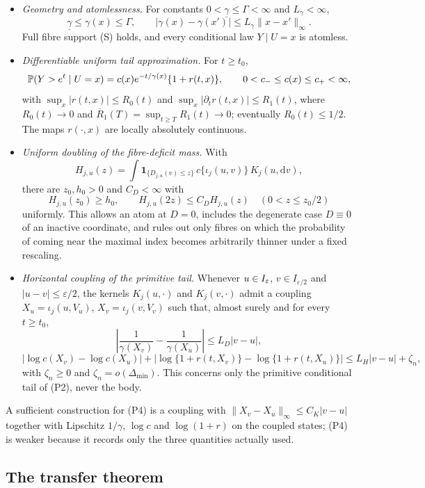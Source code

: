 \begin{itemize}
\item[(P1)] \emph{Geometry and atomlessness.} For constants
 $0<\underline\gamma\le\Gamma<\infty$ and $L_\gamma<\infty$,
 \[
  \underline\gamma\le\gamma(x)\le\Gamma,
  \qquad
  |\gamma(x)-\gamma(x')|\le L_\gamma\|x-x'\|_\infty .
 \]
 Full fibre support (S) holds, and every conditional law $Y\mid U=x$ is
 atomless.
\item[(P2)] \emph{Differentiable uniform tail approximation.} For
 $t\ge t_0$,
 \[
  \mathbb P(Y>e^t\mid U=x)=c(x)e^{-t/\gamma(x)}\{1+r(t,x)\},
  \qquad 0<c_-\le c(x)\le c_+<\infty,
 \]
 with $\sup_x|r(t,x)|\le R_0(t)$ and
 $\sup_x|\partial_tr(t,x)|\le R_1(t)$, where $R_0(t)\to0$ and
 $\overline R_1(T)=\sup_{t\ge T}R_1(t)\to0$; eventually
 $R_0(t)\le1/2$. The maps $r(\cdot,x)$ are locally absolutely
 continuous.
\item[(P3)] \emph{Uniform doubling of the fibre-deficit mass.} With
 \[
  H_{j,u}(z)=\int\mathbf 1_{\{D_{j,u}(v)\le z\}}\,
  c\{\iota_j(u,v)\}\,K_j(u,\mathrm dv),
 \]
 there are $z_0,h_0>0$ and $C_D<\infty$ with
 \[
  H_{j,u}(z_0)\ge h_0,
  \qquad
  H_{j,u}(2z)\le C_DH_{j,u}(z)
  \quad(0<z\le z_0/2)
 \]
 uniformly. This allows an atom at $D=0$, includes the degenerate case
 $D\equiv0$ of an inactive coordinate, and rules out only fibres on
 which the probability of coming near the maximal index becomes
 arbitrarily thinner under a fixed rescaling.
\item[(P4)] \emph{Horizontal coupling of the primitive tail.} Whenever
 $u\in I_\varepsilon$, $v\in I_{\varepsilon/2}$ and $|u-v|\le\varepsilon/2$, the
 kernels $K_j(u,\cdot)$ and $K_j(v,\cdot)$ admit a coupling
 $X_u=\iota_j(u,V_u)$, $X_v=\iota_j(v,V_v)$ such that, almost surely and
 for every $t\ge t_0$,
 \[
  \left|\frac1{\gamma(X_v)}-\frac1{\gamma(X_u)}\right|\le L_D|v-u|,
 \]
 \[
  |\log c(X_v)-\log c(X_u)|
  +|\log\{1+r(t,X_v)\}-\log\{1+r(t,X_u)\}|
  \le L_H|v-u|+\zeta_n,
 \]
 with $\zeta_n\ge0$ and $\zeta_n=o(\Delta_{\min})$. This concerns only
 the primitive conditional tail of (P2), never the body.
\end{itemize}

A sufficient construction for (P4) is a coupling with
$\|X_v-X_u\|_\infty\le C_K|v-u|$ together with Lipschitz $1/\gamma$,
$\log c$ and $\log(1+r)$ on the coupled states; (P4) is weaker because it
records only the three quantities actually used.

\subsection{The transfer theorem}

